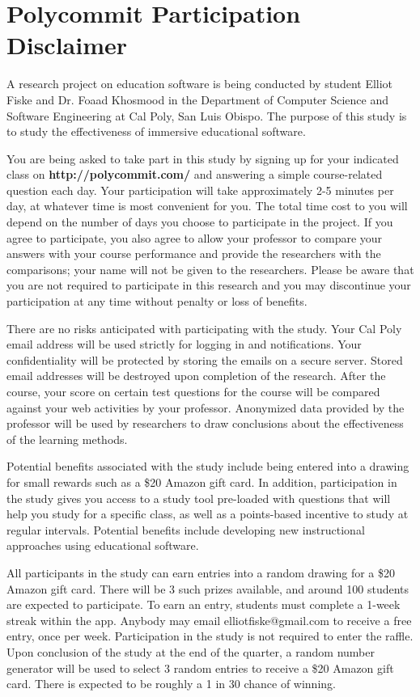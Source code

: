 
\chapter{Polycommit Participation Disclaimer}
\label{appendix:disclaimer}

A research project on education software is being conducted by student Elliot Fiske and Dr. Foaad Khosmood in the Department of Computer Science and Software Engineering at Cal Poly, San Luis Obispo. The purpose of this study is to study the effectiveness of immersive educational software.

You are being asked to take part in this study by signing up for your indicated class on \textbf{http://polycommit.com/} and answering a simple course-related question each day.  Your participation will take approximately 2-5 minutes per day, at whatever time is most convenient for you. The total time cost to you will depend on the number of days you choose to participate in the project. If you agree to participate, you also agree to allow your professor to compare your answers with your course performance and provide the researchers with the comparisons; your name will not be given to the researchers.  Please be aware that you are not required to participate in this research and you may discontinue your participation at any time without penalty or loss of benefits.

There are no risks anticipated with participating with the study. Your Cal Poly email address will be used strictly for logging in and notifications. Your confidentiality will be protected by storing the emails on a secure server. Stored email addresses will be destroyed upon completion of the research. After the course, your score on certain test questions for the course will be compared against your web activities by your professor. Anonymized data provided by the professor will be used by researchers to draw conclusions about the effectiveness of the learning methods.

Potential benefits associated with the study include being entered into a drawing for small rewards such as a \$20 Amazon gift card. In addition, participation in the study gives you access to a study tool pre-loaded with questions that will help you study for a specific class, as well as a points-based incentive to study at regular intervals. Potential benefits include developing new instructional approaches using educational software.

All participants in the study can earn entries into a random drawing for a \$20 Amazon gift card. There will be 3 such prizes available, and around 100 students are expected to participate. To earn an entry, students must complete a 1-week streak within the app. Anybody may email elliotfiske@gmail.com to receive a free entry, once per week. Participation in the study is not required to enter the raffle. Upon conclusion of the study at the end of the quarter, a random number generator will be used to select 3 random entries to receive a \$20 Amazon gift card. There is expected to be roughly a 1 in 30 chance of winning.

